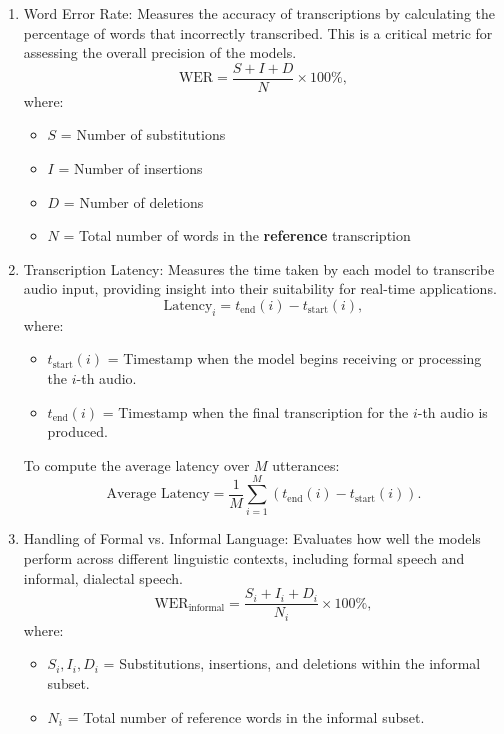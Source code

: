 \begin{enumerate}
    \item Word Error Rate: Measures the accuracy of transcriptions by calculating the percentage of words that incorrectly transcribed. This is a critical metric for assessing the overall precision of the models.
    \[
    \text{WER} = \frac{S + I + D}{N} \times 100\%,
    \]
    where:
    \begin{itemize}
        \item \(S\) = Number of substitutions
        \item \(I\) = Number of insertions
        \item \(D\) = Number of deletions
        \item \(N\) = Total number of words in the \textbf{reference} transcription
    \end{itemize}

    \item Transcription Latency: Measures the time taken by each model to transcribe audio input, providing insight into their suitability for real-time applications.
    \[
    \text{Latency}_i = t_{\text{end}}(i) - t_{\text{start}}(i),
    \]
    where:
    \begin{itemize}
        \item \(t_{\text{start}}(i)\) = Timestamp when the model begins receiving or processing the \(i\)-th audio.
        \item \(t_{\text{end}}(i)\) = Timestamp when the final transcription for the \(i\)-th audio is produced.
    \end{itemize}

    To compute the average latency over \(M\) utterances:
    \[
    \text{Average Latency} = \frac{1}{M} \sum_{i=1}^{M} \left( t_{\text{end}}(i) - t_{\text{start}}(i) \right).
    \]

    \item Handling of Formal vs. Informal Language: Evaluates how well the models perform across different linguistic contexts, including formal speech and informal, dialectal speech.
    \[
    \text{WER}_{\text{informal}} = \frac{S_i + I_i + D_i}{N_i} \times 100\%,
    \]
    where:
    \begin{itemize}
        \item \(S_i, I_i, D_i\) = Substitutions, insertions, and deletions within the informal subset.
        \item \(N_i\) = Total number of reference words in the informal subset.
    \end{itemize}
\end{enumerate}

